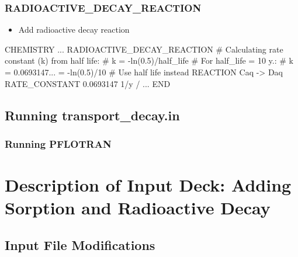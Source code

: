\documentclass{beamer}
\newcommand\bluecomment[1]{{{\color{blue} #1}}}
\newcommand\magentacomment[1]{{{\color{magenta} #1}}}
\begin{document}
\begin{frame}\frametitle{RADIOACTIVE\_DECAY\_REACTION}

\begin{itemize}
  \item Add radioactive decay reaction
\end{itemize}

\begin{semiverbatim}

CHEMISTRY
  ...
  \magentacomment{RADIOACTIVE_DECAY_REACTION}
    \bluecomment{# Calculating rate constant (k) from half life:}
    \bluecomment{#   k = -ln(0.5)/half_life}
    \bluecomment{# For half_life = 10 y.:}
    \bluecomment{#   k = 0.0693147... = -ln(0.5)/10}
    \bluecomment{# Use half life instead}
    \magentacomment{REACTION Caq -> Daq}
    \magentacomment{RATE_CONSTANT 0.0693147 1/y}
  \magentacomment{/}
  ...
END
\end{semiverbatim}

\end{frame}

\subsection{Running transport\_decay.in}

\begin{frame}[fragile]\frametitle{Running PFLOTRAN}


\end{frame}

\section{Description of Input Deck: Adding Sorption and Radioactive Decay}

\subsection{Input File Modifications}
\end{document}
